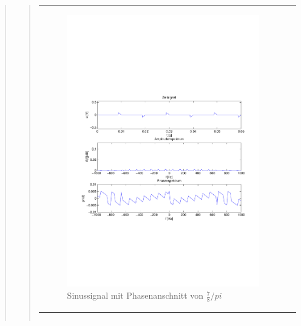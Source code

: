 \begin{quote}
\begin{quote}
\begin{center}
\begin{tabular}{ll}
\begin{minipage}{0.6\textwidth}
                   \begin{figure}[H]
                        \label{fig:}
                        \includegraphics[scale=0.5, trim = 2cm 7cm 1.5cm 8.5cm, clip]{./Bilder/Phasenanschnitt78pi.pdf} %
                        \caption{Sinussignal mit Phasenanschnitt von $\frac{7}{8}/pi$}
                    \end{figure}
                 \vspace{-1.5em}

                \end{minipage}

            \end{tabular}
            \end{center}
            
            \begin{center}
            \begin{tabular}{ll}


\end{tabular}
\end{center}
\end{quote}
\end{quote}
